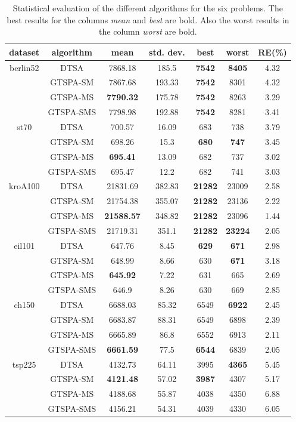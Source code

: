\begin{table}[ht]
\begin{center}
\begin{tabular}{|c|c|c|c|c|c|c|}
	\hline
	dataset & algorithm & mean & std. dev. & best & worst & RE(\%)\\
	\hline
	\multirow{4}{*}{berlin52}		& DTSA & 7868.18 & 185.5 & \textbf{7542} & \textbf{8405} & 4.32\\
		& GTSPA-SM & 7867.68 & 193.33 & \textbf{7542} & 8301 & 4.32\\
		& GTSPA-MS & \textbf{7790.32} & 175.78 & \textbf{7542} & 8263 & 3.29\\
		& GTSPA-SMS & 7798.98 & 192.88 & \textbf{7542} & 8281 & 3.41\\
	\hline
	\multirow{4}{*}{st70}		& DTSA & 700.57 & 16.09 & 683 & 738 & 3.79\\
		& GTSPA-SM & 698.26 & 15.3 & \textbf{680} & \textbf{747} & 3.45\\
		& GTSPA-MS & \textbf{695.41} & 13.09 & 682 & 737 & 3.02\\
		& GTSPA-SMS & 695.47 & 12.2 & 682 & 741 & 3.03\\
	\hline
	\multirow{4}{*}{kroA100}		& DTSA & 21831.69 & 382.83 & \textbf{21282} & 23009 & 2.58\\
		& GTSPA-SM & 21754.38 & 355.07 & \textbf{21282}& 23136 & 2.22\\
		& GTSPA-MS & \textbf{21588.57} & 348.82 & \textbf{21282} & 23096 & 1.44\\
		& GTSPA-SMS & 21719.31 & 351.1 & \textbf{21282} & \textbf{23224} & 2.05\\
	\hline
	\multirow{4}{*}{eil101}		& DTSA & 647.76 & 8.45 & \textbf{629} & \textbf{671} & 2.98\\
		& GTSPA-SM & 648.99 & 8.66 & 630 & \textbf{671} & 3.18\\
		& GTSPA-MS & \textbf{645.92} & 7.22 & 631 & 665 & 2.69\\
		& GTSPA-SMS & 646.9 & 8.26 & 630 & 669 & 2.85\\
	\hline
	\multirow{4}{*}{ch150}		& DTSA & 6688.03 & 85.32 & 6549 & \textbf{6922} & 2.45\\
		& GTSPA-SM & 6683.87 & 88.31 & 6549 & 6898 & 2.39\\
		& GTSPA-MS & 6665.89 & 86.8 & 6552 & 6913 & 2.11\\
		& GTSPA-SMS & \textbf{6661.59} & 77.5 & \textbf{6544} & 6839 & 2.05\\
	\hline
	\multirow{4}{*}{tsp225}		& DTSA & 4132.73 & 64.11 & 3995 & \textbf{4365} & 5.45\\
		& GTSPA-SM & \textbf{4121.48} & 57.02 & \textbf{3987} & 4307 & 5.17\\
		& GTSPA-MS & 4188.68 & 55.87 & 4038 & 4350 & 6.88\\
		& GTSPA-SMS & 4156.21 & 54.31 & 4039 & 4330 & 6.05\\
	\hline
\end{tabular}
\caption{Statistical evaluation of the different algorithms for the six problems. The best results for the columns \textit{mean} and \textit{best} are bold. Also the worst results in the column \textit{worst} are bold.}
\label{table:algo-stats}
\end{center}
\end{table}